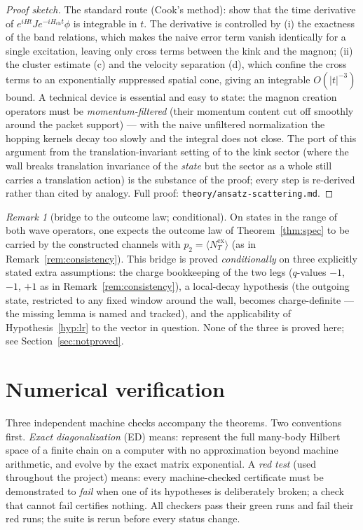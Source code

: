 \documentclass[11pt]{article}
\theoremstyle{definition}
\theoremstyle{remark}
\newtheorem{remark}[theorem]{Remark}
\begin{document}
\begin{proof}[Proof sketch]
The standard route (Cook's method): show that the time derivative of
$e^{iHt}J e^{-iH_{\mathrm{ch}}t}\phi$ is integrable in $t$.  The derivative
is controlled by (i) the exactness of the band relations, which makes the
naive error term vanish identically for a single excitation, leaving only
cross terms between the kink and the magnon; (ii) the cluster estimate
(c) and the velocity separation (d), which confine the cross terms to an
exponentially suppressed spatial cone, giving an integrable
$O(|t|^{-3})$ bound.  A technical device is essential and easy to state: the
magnon creation operators must be \emph{momentum-filtered} (their momentum
content cut off smoothly around the packet support) --- with the naive
unfiltered normalization the hopping kernels decay too slowly and the
integral does not close.  The port of this argument from the
translation-invariant setting of \cite{bachmann2015} to the kink sector
(where the wall breaks translation invariance of the \emph{state} but the
sector as a whole still carries a translation action) is the substance of
the proof; every step is re-derived rather than cited by analogy.  Full
proof: \texttt{theory/ansatz-scattering.md}.
\end{proof}

\begin{remark}[bridge to the outcome law; conditional]\label{rem:bridge}
On states in the range of both wave operators, one expects the outcome law of
Theorem~\ref{thm:spec} to be carried by the constructed channels with
$p_2=\langle N_T^{\mathrm{ex}}\rangle$ (as in
Remark~\ref{rem:consistency}).  This bridge is proved \emph{conditionally}
on three explicitly stated extra assumptions: the charge bookkeeping of the
two legs ($q$-values $-1$, $-1$, $+1$ as in Remark~\ref{rem:consistency}), a
local-decay hypothesis (the outgoing state, restricted to any fixed window
around the wall, becomes charge-definite --- the missing lemma is named and
tracked), and the applicability of Hypothesis~\ref{hyp:lr} to the vector in
question.  None of the three is proved here; see
Section~\ref{sec:notproved}.
\end{remark}

\section{Numerical verification}\label{sec:numerics}

Three independent machine checks accompany the theorems.  Two conventions
first.  \emph{Exact diagonalization} (ED) means: represent the full
many-body Hilbert space of a finite chain on a computer with no
approximation beyond machine arithmetic, and evolve by the exact matrix
exponential.  A \emph{red test} (used throughout the project) means: every
machine-checked certificate must be demonstrated to \emph{fail} when one of
its hypotheses is deliberately broken; a check that cannot fail certifies
nothing.  All checkers pass their green runs and fail their red runs; the
suite is rerun before every status change.
\end{document}
